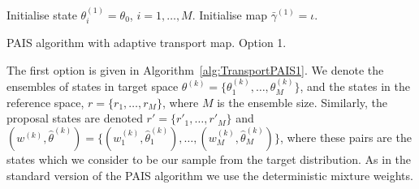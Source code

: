 \documentclass[final]{siamltex}
\begin{document}
\begin{table}
\begin{algorithm}[H]
\DontPrintSemicolon
\BlankLine
Initialise state $\theta^{(1)}_i = \theta_0$, \quad $i = 1,\dots,M$.\;
Initialise map $\bar{\gamma}^{(1)} = \iota$.\;
\caption{PAIS algorithm with adaptive transport map. Option 1.\label{alg:TransportPAIS1}}
\end{algorithm}
\end{table}

The first option is given in Algorithm~\ref{alg:TransportPAIS1}. We denote the ensembles of states in target space $\theta^{(k)} = \{\theta^{(k)}_1,\dots,\theta^{(k)}_M\}$, and the states in the reference space, $r = \{r_1,\dots,r_M\}$, where $M$ is the ensemble size. Similarly, the proposal states are denoted $r' = \{r'_1,\dots,r'_M\}$ and $(w^{(k)}, \hat{\theta}^{(k)}) = \{(w^{(k)}_1, \hat{\theta}^{(k)}_1),\dots,(w^{(k)}_M, \hat{\theta}^{(k)}_M)\}$, where these pairs are the states which we consider to be our sample from the target distribution. As in the standard version of the PAIS algorithm we use the deterministic mixture weights.
\end{document}
